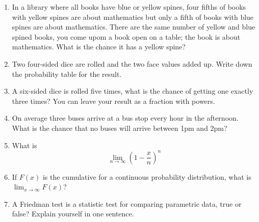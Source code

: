 \documentclass{article}
\newif\ifanswer
\begin{document}
\begin{enumerate}
\item In a library where all books have blue or yellow spines, four
  fifths of books with yellow spines are about mathematics but only
  a fifth of books with blue spines are about mathematics. There
  are the same number of yellow and blue spined books, you come upom a book open on a table; the book is about mathematics. What is the chance it has a yellow spine?

  \ifanswer
    Solution: In the obvious notation we need $p(M)$:
  $$p(M)=p(M|B)p(B)+p(M|Y)p(Y)=0.1+0.4=0.5$$
  and using Bayes:
  $$p(Y|M)=p(M|Y)p(Y)/p(M)=0.4/0.5=0.8$$
  \fi

\item Two four-sided dice are rolled and the two face values added up. Write down the probability table for the result.

  \ifanswer   Solution: $p(2)=1/16$, $p(3)=1/8$, $p(4)=3/16$, $p(5)=1/4$, $p(6)=3/16$, $p(7)=1/8$ and $p(8)=1/16$.
  \fi

  \item A six-sided dice is rolled five times, what is the chance of
    getting one exactly three times? You can leave your result as a fraction with powers.

    \ifanswer  Solution: 
    $$p=\left(\begin{array}{c}5\\3\end{array}\right)\frac{1}{6}^3\frac{5}{6}^2
      = \frac{20\times 5^2}{2\times 6^5}
      $$
      \fi

    \item On average three buses arrive at a bus stop every hour in the afternoon. What is the chance that no buses will arrive between 1pm and 2pm?

      \ifanswer  Solution: 
      $$p=e^{-3}$$
      \fi

    \item What is
      $$\lim_{n\rightarrow\infty}\left(1-\frac{x}{n}\right)^n$$

      \ifanswer
        Solution: 
      $$\lim_{n\rightarrow\infty}\left(1-\frac{x}{n}\right)^n=e^{-x}$$
        \fi
        
    \item If $F(x)$ is the cumulative for a continuous probability distribution, what is $\lim_{x\rightarrow\infty}F(x)$?

      \ifanswer
        Solution: 
      $$\lim_{x\rightarrow\infty}F(x)=1$$
  \fi
\item A Friedman test is a statistic test for comparing parametric data,
true or false? Explain yourself in one sentence.


\end{enumerate}
\end{document}
